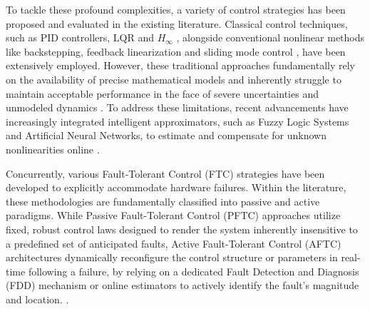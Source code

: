 To tackle these profound complexities, a variety of control strategies has been proposed and evaluated in the existing literature. Classical control techniques, such as PID controllers, LQR and $H_{\infty}$ \cite{trmspid, trmsHinf}, alongside conventional nonlinear methods like backstepping, feedback linearization and sliding mode control \cite{trms_smc,trms_bsc, trmsFeedbackL}, have been extensively employed. However, these traditional approaches fundamentally rely on the availability of precise mathematical models and inherently struggle to maintain acceptable performance in the face of severe uncertainties and unmodeled dynamics \cite{control_methods}. To address these limitations, recent advancements have increasingly integrated intelligent approximators, such as Fuzzy Logic Systems and Artificial Neural Networks, to estimate and compensate for unknown nonlinearities online \cite{trmsFuzzyFault, rbfnn2, NN_Control_Ref, guettal2020nnbsc, guettal2020fnnbsc}. 

Concurrently, various Fault-Tolerant Control (FTC) strategies have been developed to explicitly accommodate hardware failures. Within the literature, these methodologies are fundamentally classified into passive and active paradigms. While  Passive Fault-Tolerant Control (PFTC) approaches utilize fixed, robust control laws designed to render the system inherently insensitive to a predefined set of anticipated faults, Active Fault-Tolerant Control (AFTC) architectures dynamically reconfigure the control structure or parameters in real-time following a failure, by relying on a dedicated Fault Detection and Diagnosis (FDD) mechanism or online estimators to actively identify the fault's magnitude and location. \cite{ftc1, Zhang2013f, fault}. 


